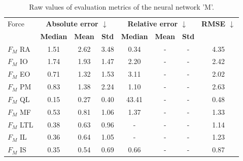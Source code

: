\begin{table}[h]
\centering
\caption{Raw values of evaluation metrics of the neural network 'M'.}
\label{tab:prelim:m.tex}
\begin{tabular}{lccccccc}
\toprule
Force & \multicolumn{3}{c}{\bfseries Absolute error $\downarrow$} & \multicolumn{3}{c}{\bfseries Relative error $\downarrow$} & \bfseries RMSE $\downarrow$ \\
  & \bfseries Median & \bfseries Mean & \bfseries Std & \bfseries Median & \bfseries Mean & \bfseries Std & \bfseries   \\
\midrule
$F_M$ RA & 1.51 & 2.62 & 3.48 & 0.34 & - & - & 4.35 \\
$F_M$ IO & 1.74 & 1.93 & 1.47 & 2.20 & - & - & 2.42 \\
$F_M$ EO & 0.71 & 1.32 & 1.53 & 3.11 & - & - & 2.02 \\
$F_M$ PM & 0.83 & 1.38 & 2.24 & 1.10 & - & - & 2.63 \\
$F_M$ QL & 0.15 & 0.27 & 0.40 & 43.41 & - & - & 0.48 \\
$F_M$ MF & 0.53 & 0.81 & 1.06 & 1.37 & - & - & 1.33 \\
$F_M$ LTL & 0.38 & 0.63 & 0.96 & - & - & - & 1.14 \\
$F_M$ IL & 0.36 & 0.64 & 1.05 & - & - & - & 1.23 \\
$F_M$ IS & 0.35 & 0.54 & 0.69 & 0.66 & - & - & 0.87 \\
\bottomrule
\end{tabular}
\end{table}
